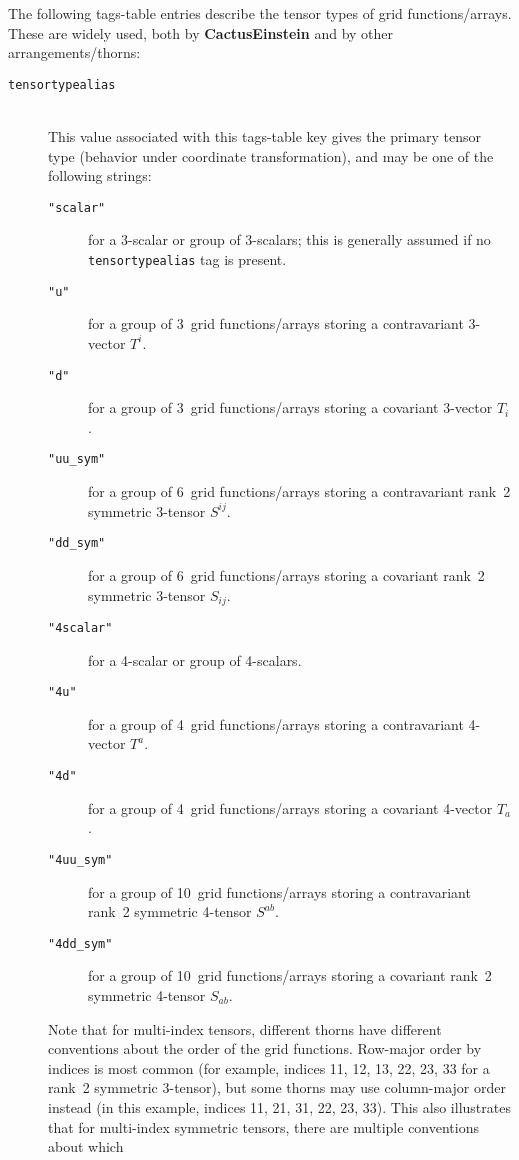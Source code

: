 The following tags-table entries describe the tensor types of grid
functions/arrays.  These are widely used, both by \textbf{CactusEinstein}
and by other arrangements/thorns:
\begin{description}
\item[\texttt{tensortypealias}]\mbox{}\\
	This value associated with this tags-table key gives the
	primary tensor type (behavior under coordinate transformation),
	and may be one of the following strings:
	\begin{description}
	\item[\texttt{"scalar"}]
		for a 3-scalar or group of 3-scalars;
		this is generally assumed if no
		\texttt{tensortypealias} tag is present.
	\item[\texttt{"u"}]
		for a group of 3~grid functions/arrays
		storing a contravariant 3-vector $T^i$.
	\item[\texttt{"d"}]
		for a group of 3~grid functions/arrays
		storing a covariant 3-vector $T_i$.
	\item[\texttt{"uu\_sym"}]
		for a group of 6~grid functions/arrays
		storing a contravariant rank~2 symmetric 3-tensor $S^{ij}$.
	\item[\texttt{"dd\_sym"}]
		for a group of 6~grid functions/arrays
		storing a covariant rank~2 symmetric 3-tensor $S_{ij}$.
	\item[\texttt{"4scalar"}]
		for a 4-scalar or group of 4-scalars.
	\item[\texttt{"4u"}]
		for a group of 4~grid functions/arrays
		storing a contravariant 4-vector $T^a$.
	\item[\texttt{"4d"}]
		for a group of 4~grid functions/arrays
		storing a covariant 4-vector $T_a$.
	\item[\texttt{"4uu\_sym"}]
		for a group of 10~grid functions/arrays
		storing a contravariant rank~2 symmetric 4-tensor $S^{ab}$.
	\item[\texttt{"4dd\_sym"}]
		for a group of 10~grid functions/arrays
		storing a covariant rank~2 symmetric 4-tensor $S_{ab}$.
	\end{description}
	Note that for multi-index tensors, different thorns have different
	conventions about the order of the grid functions.  Row-major
	order by indices is most common (for example, indices 11, 12,
	13, 22, 23, 33 for a rank~2 symmetric 3-tensor), but some thorns
	may use column-major order instead (in this example, indices
	11, 21, 31, 22, 23, 33).  This also illustrates that for multi-index
	symmetric tensors, there are multiple conventions about which

\end{description}
